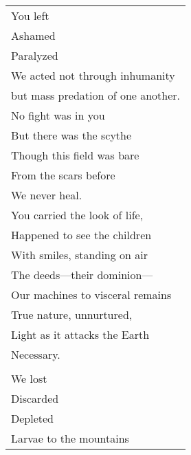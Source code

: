 \documentclass{article}
\begin{document}
\begin{center}
\begin{tabular}{l}
You left \\
Ashamed \\
Paralyzed \\
We acted not through inhumanity \\
but mass predation of one another. \\
No fight was in you \\
But there was the scythe \\
Though this field was bare \\
From the scars before \\
We never heal. \\
You carried the look of life, \\
Happened to see the children \\
With smiles, standing on air \\
The deeds---their dominion--- \\
Our machines to visceral remains \\
True nature, unnurtured, \\
Light as it attacks the Earth \\
Necessary. \\
\\
We lost \\
Discarded \\
Depleted \\
Larvae to the mountains \\
\end{tabular}
\end{center}
\end{document}
